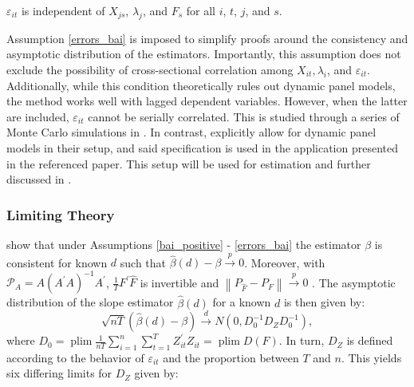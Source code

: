 \begin{assumption}\label{errors_bai}
    \(\varepsilon_{i t}\) is independent of \(X_{j s}\), \(\lambda_j\), and \(F_s\) for all \(i\), \(t\), \(j\), and \(s\).
\end{assumption}

Assumption \ref{errors_bai} is imposed to simplify proofs around the consistency and asymptotic distribution of the estimators. Importantly, this assumption does not exclude the possibility of cross-sectional correlation among $X_{i t}, \lambda_i$, and $\varepsilon_{i t}$. Additionally, while this condition theoretically rules out dynamic panel models, the method works well with lagged dependent variables. However, when the latter are included, $\varepsilon_{it}$ cannot be serially correlated. This is studied through a series of Monte Carlo simulations in \citet{bai2009supplement}. In contrast, \citet{bada2014parameter} explicitly allow for dynamic panel models in their setup, and said specification is used in the application presented in the referenced paper.  This setup will be used for estimation and further discussed in .




\subsubsection{Limiting Theory}\label{bai.limiting}



\citet{bai2009panel} show that under Assumptions \ref{bai_positive} - \ref{errors_bai} the estimator $\beta$ is consistent for known $d$ such that $\hat{\beta}(d) -\beta \stackrel{p}{\longrightarrow} 0$. Moreover, with $\mathcal{P}_A = A\left(A^{\prime} A\right)^{-1} A^{\prime}$, $\frac{1}{T}F^\prime \hat{F}$ is invertible and  $\left\|P_{\hat{F}}-P_{F}\right\| \stackrel{p}{\longrightarrow} 0$ . The asymptotic distribution of the slope estimator $\hat{\beta}(d)$ for a known $d$ is then given by:
$$
\sqrt{n T}(\hat{\beta}(d)-\beta) \stackrel{d}{\longrightarrow}  N\left(0, D_0^{-1} D_Z D_0^{-1}\right),
$$
where \(D_0 = \operatorname{plim} \frac{1}{n T} \sum_{i=1}^n \sum_{t=1}^T Z_{i t}^{\prime} Z_{i t} = \operatorname{plim} D(F) \). In turn, $D_Z$ is defined according to the behavior of $\varepsilon_{it}$ and the proportion between $T$ and $n$. This yields six differing limits for $D_Z$ given by:

